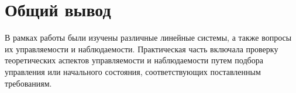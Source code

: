 \section{Общий вывод}

В рамках работы были изучены различные линейные системы, а также вопросы их управляемости и наблюдаемости. Практическая часть включала проверку теоретических аспектов управляемости и наблюдаемости путем подбора управления или начального состояния, соответствующих поставленным требованиям.